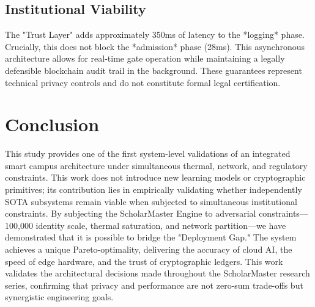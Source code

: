 \documentclass[conference]{IEEEtran}
\begin{document}
\subsection{Institutional Viability}
The "Trust Layer" \cite{p8} adds approximately 350ms of latency to the *logging* phase. Crucially, this does not block the *admission* phase (28ms). This asynchronous architecture allows for real-time gate operation while maintaining a legally defensible blockchain audit trail in the background. These guarantees represent technical privacy controls and do not constitute formal legal certification.

\section{Conclusion}
This study provides one of the first system-level validations of an integrated smart campus architecture under simultaneous thermal, network, and regulatory constraints. This work does not introduce new learning models or cryptographic primitives; its contribution lies in empirically validating whether independently SOTA subsystems remain viable when subjected to simultaneous institutional constraints. By subjecting the ScholarMaster Engine to adversarial constraints—100,000 identity scale, thermal saturation, and network partition—we have demonstrated that it is possible to bridge the "Deployment Gap." The system achieves a unique Pareto-optimality, delivering the accuracy of cloud AI, the speed of edge hardware, and the trust of cryptographic ledgers. This work validates the architectural decisions made throughout the ScholarMaster research series, confirming that privacy and performance are not zero-sum trade-offs but synergistic engineering goals.
\end{document}
